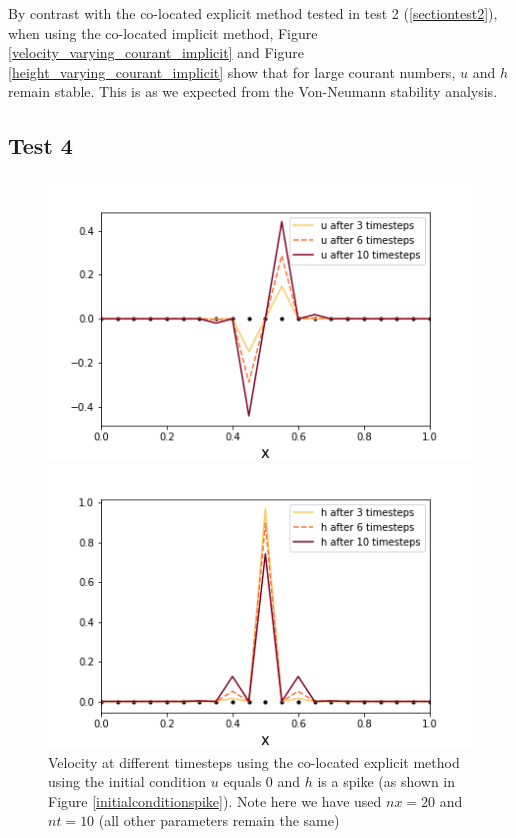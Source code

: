 \documentclass[a4paper,12pt, notitlepage]{article}
\begin{document}
By contrast with the co-located explicit method tested in test 2 (\ref{sectiontest2}), when using the co-located implicit method, Figure \ref{velocity_varying_courant_implicit} and Figure \ref{height_varying_courant_implicit} show that for large courant numbers, $u$ and $h$ remain stable. This is as we expected from the Von-Neumann stability analysis.

\subsection{Test 4}\label{subsectiontest4}

\begin{figure} [H]
	\begin{minipage}{.5\textwidth}
		\ContinuedFloat*
		\captionsetup{width=0.9\textwidth}
		\captionsetup{justification=centering}
		\includegraphics[width=\textwidth]{velocity_colocated_explicit_spike.png}
		\caption{\label{velocity_colocated_explicit_spike} Velocity at different timesteps using the co-located explicit method using the initial condition $u$ equals 0 and $h$ is a spike (as shown in Figure \ref{initialconditionspike}). Note here we have used $nx = 20$ and $nt = 10$ (all other parameters remain the same)} 
	\end{minipage}
	\begin{minipage}{.5\textwidth}
		\ContinuedFloat
		\captionsetup{width=0.9\textwidth}
		\captionsetup{justification=centering}
		\includegraphics[width=\textwidth]{height_colocated_explicit_spike.png}

\end{minipage}
\end{figure}
\end{document}
